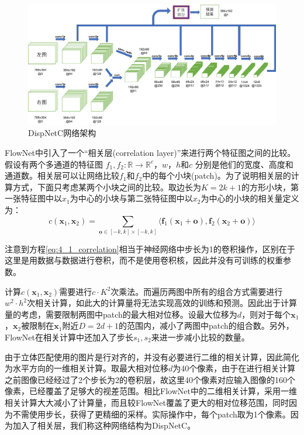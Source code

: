 \begin{figure}[!htbp]
	\centering\includegraphics[width=6in]{figures/4_1_dispnetc_architecture}
	\caption{DispNetC网络架构}\label{fig:4_1_DispNetC}
\end{figure}

FlowNet中引入了一个“相关层(correlation layer)”来进行两个特征图之间的比较。假设有两个多通道的特征图
$f_1, f_2: \mathbb{R} \rightarrow \mathbb{R}^c$，$w$，$h$和$c$ 
分别是他们的宽度、高度和通道数。相关层可以让网络比较$f_1$和$f_2$中的每个小块(patch)。为了说明相关层的计算方式，下面只考虑某两个小块之间的比较。取边长为$K=2k+1$的方形小块，第一张特征图中以$x_1$为中心的小块与第二张特征图中以$x_2$为中心的小块的相关量定义为：
\begin{equation}\label{eq:4_1_correlation}  %
c(\mathbf{x}_1, \mathbf{x}_2) = \sum_{\mathbf{o} \in [-k, k] \times [-k, k]} { \langle \mathbf{f}_1(\mathbf{x}_1 + \mathbf{o}), \mathbf{f}_2(\mathbf{x}_2 + \mathbf{o}) \rangle }
\end{equation}

注意到方程\ref{eq:4_1_correlation}相当于神经网络中步长为1的卷积操作，区别在于这里是用数据与数据进行卷积，而不是使用卷积核，因此并没有可训练的权重参数。

计算$c(\mathbf{x}_1, \mathbf{x}_2)$需要进行$c\cdot K^2$次乘法。而遍历两图中所有的组合方式需要进行$w^2  \cdot h^2$次相关计算，如此大的计算量将无法实现高效的训练和预测。因此出于计算量的考虑，需要限制两图中patch的最大相对位移。设最大位移为$d$，则对于每个$\mathbf{x}_1$，$\mathbf{x}_2$被限制在$\mathbf{x}_1$附近$D=2d+1$的范围内，减小了两图中patch的组合数。另外，FlowNet在相关计算中还加入了步长$s_1, s_2$来进一步减小比较的数量。

由于立体匹配使用的图片是行对齐的，并没有必要进行二维的相关计算，因此简化为水平方向的一维相关计算。取最大相对位移$d$为40个像素，由于在进行相关计算之前图像已经经过了2个步长为2的卷积层，故这里40个像素对应输入图像的160个像素，已经覆盖了足够大的视差范围。相比FlowNet中的二维相关计算，采用一维相关计算大大减小了计算量，而且较FlowNet覆盖了更大的相对位移范围，同时因为不需使用步长，获得了更精细的采样。实际操作中，每个patch取为1个像素。因为加入了相关层，我们称这种网络结构为DispNetC。

